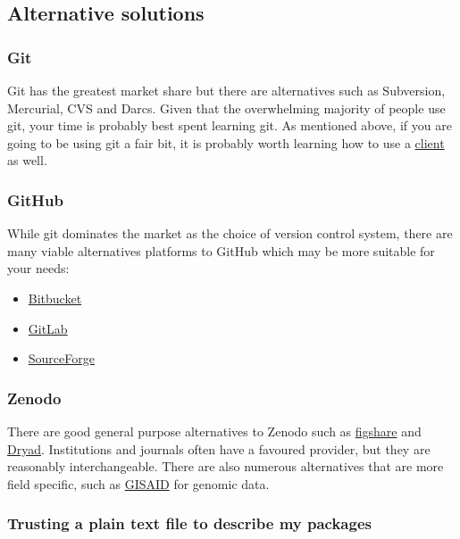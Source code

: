 \documentclass[11pt,onecolumn]{scrartcl}
\begin{document}
\subsection{Alternative solutions}
\label{sec:orgb0d3020}

\subsubsection*{Git}
\label{sec:org9c474b3}

Git has the greatest market share but there are alternatives such as Subversion,
Mercurial, CVS and Darcs. Given that the overwhelming majority of people use
git, your time is probably best spent learning git. As mentioned above, if you
are going to be using git a fair bit, it is probably worth learning how to use a
\hyperref[sec:org8497bad]{client} as well.

\subsubsection*{GitHub}
\label{sec:orga37c146}

While git dominates the market as the choice of version control system, there
are many viable alternatives platforms to GitHub which may be more suitable for
your needs:

\begin{itemize}
\item \href{https://bitbucket.org/product/}{Bitbucket}
\item \href{https://about.gitlab.com/}{GitLab}
\item \href{https://sourceforge.net/}{SourceForge}
\end{itemize}

\subsubsection*{Zenodo}
\label{sec:orgc109fc7}

There are good general purpose alternatives to Zenodo such as \href{https://figshare.com/}{figshare} and
\href{http://datadryad.org/}{Dryad}. Institutions and journals often have a favoured provider, but they are
reasonably interchangeable. There are also numerous alternatives that are more
field specific, such as \href{http://www.gisaid.org/}{GISAID} for genomic data.

\subsubsection*{Trusting a plain text file to describe my packages}
\label{sec:org6967a09}
\end{document}
